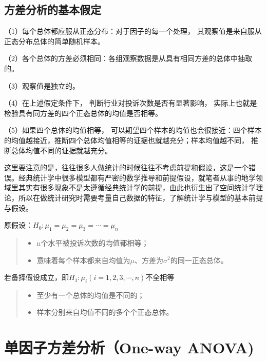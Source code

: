 \documentclass[]{ctexbook}
\providecommand{\tightlist}{%
  \setlength{\itemsep}{0pt}\setlength{\parskip}{0pt}}
\begin{document}
\hypertarget{ux65b9ux5deeux5206ux6790ux7684ux57faux672cux5047ux5b9a}{%
\subsection{方差分析的基本假定}\label{ux65b9ux5deeux5206ux6790ux7684ux57faux672cux5047ux5b9a}}

（1）每个总体都应服从正态分布：对于因子的每一个处理， 其观察值是来自服从正态分布总体的简单随机样本。

（2）各个总体的方差必须相同：各组观察数据是从具有相同方差的总体中抽取的。

（3）观察值是独立的。

（4）在上述假定条件下， 判断行业对投诉次数是否有显著影响， 实际上也就是检验具有同方差的四个正态总体的均值是否相等。

（5）如果四个总体的均值相等， 可以期望四个样本的均值也会很接近：四个样本的均值越接近，推断四个总体均值相等的证据也就越充分；样本均值越不同， 推断总体均值不同的证据就越充分。

这里要注意的是，往往很多人做统计的时候往往不考虑前提和假设，这是一个错误。经典统计学中很多模型都有严密的数学推导和前提假设，就笔者从事的地学领域里其实有很多现象不是太遵循经典统计学的前提，由此也衍生出了空间统计学理论，所以在做统计研究时需要考量自己数据的特征，了解统计学与模型的基本前提与假设。

原假设：\(H_0:\mu_1=\mu_2=\mu_3=\cdots=\mu_n\)

\begin{quote}
\begin{itemize}
\tightlist
\item
  n个水平被投诉次数的均值都相等；
\item
  意味着每个样本都来自均值为\(\mu\)、方差为\(\sigma^2\)的同一正态总体。
\end{itemize}
\end{quote}

若备择假设成立，即\(H_1:\mu_i(i=1,2,3,\cdots,n)\)不全相等

\begin{quote}
\begin{itemize}
\tightlist
\item
  至少有一个总体的均值是不同的；
\item
  样本分别来自均值不同的多个个正态总体。
\end{itemize}
\end{quote}

\hypertarget{ux5355ux56e0ux5b50ux65b9ux5deeux5206ux6790one-way-anova}{%
\section{单因子方差分析（One-way ANOVA)}\label{ux5355ux56e0ux5b50ux65b9ux5deeux5206ux6790one-way-anova}}
\end{document}
